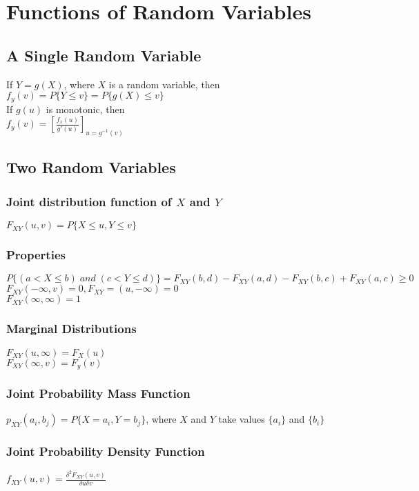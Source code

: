 \section*{Functions of Random Variables}

\subsection*{A Single Random Variable}
If $Y=g(X)$, where $X$ is a random variable, then \\
$f_y(v)=P\{Y\leq v\}=P\{g(X)\leq v\}$ \\
If $g(u)$ is monotonic, then \\
$f_y(v)=[\frac{f_x(u)}{g'(u)}]_{u=g^{-1}(v)}$

\subsection*{Two Random Variables}

\subsubsection*{Joint distribution function of $X$ and $Y$}
$F_{XY}(u,v)=P\{X\leq u, Y\leq v\}$

\subsubsection*{Properties}
$P\{(a<X\leq b) \; and \; (c<Y\leq d)\}=F_{XY}(b,d)-F_{XY}(a,d)-F_{XY}(b,c)+F_{XY}(a,c)\geq 0$ \\
$F_{XY}(-\infty,v)=0, F_{XY}=(u,-\infty)=0$ \\
$F_{XY}(\infty, \infty)=1$

\subsubsection*{Marginal Distributions}
$F_{XY}(u, \infty)=F_X(u)$ \\
$F_{XY}(\infty, v)=F_y(v)$ \\

\subsubsection*{Joint Probability Mass Function}
$p_{XY}(a_i, b_j)=P\{X=a_i, Y=b_j\}$, where $X$ and $Y$ take values $\{a_i\}$ and $\{b_i\}$

\subsubsection*{Joint Probability Density Function}
$f_{XY}(u,v)=\frac{\delta^2F_{XY}(u,v)}{\delta u \delta v}$

